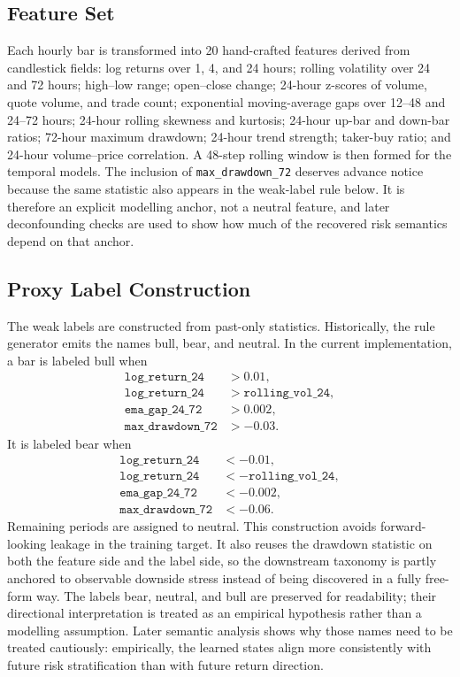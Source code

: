 \documentclass[a4paper,fleqn]{cas-dc}
\begin{document}
\subsection{Feature Set}
Each hourly bar is transformed into 20 hand-crafted features derived from candlestick fields: log returns over 1, 4, and 24 hours; rolling volatility over 24 and 72 hours; high--low range; open--close change; 24-hour z-scores of volume, quote volume, and trade count; exponential moving-average gaps over 12--48 and 24--72 hours; 24-hour rolling skewness and kurtosis; 24-hour up-bar and down-bar ratios; 72-hour maximum drawdown; 24-hour trend strength; taker-buy ratio; and 24-hour volume--price correlation. A 48-step rolling window is then formed for the temporal models. The inclusion of \texttt{max\_drawdown\_72} deserves advance notice because the same statistic also appears in the weak-label rule below. It is therefore an explicit modelling anchor, not a neutral feature, and later deconfounding checks are used to show how much of the recovered risk semantics depend on that anchor.

\subsection{Proxy Label Construction}
The weak labels are constructed from past-only statistics. Historically, the rule generator emits the names bull, bear, and neutral. In the current implementation, a bar is labeled bull when
\begin{align*}
\texttt{log\_return\_24} &> 0.01, \\
\texttt{log\_return\_24} &> \texttt{rolling\_vol\_24}, \\
\texttt{ema\_gap\_24\_72} &> 0.002, \\
\texttt{max\_drawdown\_72} &> -0.03.
\end{align*}
It is labeled bear when
\begin{align*}
\texttt{log\_return\_24} &< -0.01, \\
\texttt{log\_return\_24} &< -\texttt{rolling\_vol\_24}, \\
\texttt{ema\_gap\_24\_72} &< -0.002, \\
\texttt{max\_drawdown\_72} &< -0.06.
\end{align*}
Remaining periods are assigned to neutral. This construction avoids forward-looking leakage in the training target. It also reuses the drawdown statistic on both the feature side and the label side, so the downstream taxonomy is partly anchored to observable downside stress instead of being discovered in a fully free-form way. The labels bear, neutral, and bull are preserved for readability; their directional interpretation is treated as an empirical hypothesis rather than a modelling assumption. Later semantic analysis shows why those names need to be treated cautiously: empirically, the learned states align more consistently with future risk stratification than with future return direction.
\end{document}

